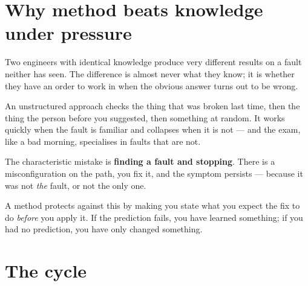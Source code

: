 \section{Why method beats knowledge under pressure}

Two engineers with identical knowledge produce very different results on a fault
neither has seen. The difference is almost never what they know; it is whether
they have an order to work in when the obvious answer turns out to be wrong.

An unstructured approach checks the thing that was broken last time, then the
thing the person before you suggested, then something at random. It works
quickly when the fault is familiar and collapses when it is not --- and the exam,
like a bad morning, specialises in faults that are not.

\begin{alertbox}
The characteristic mistake is \textbf{finding a fault and stopping}. There is a
misconfiguration on the path, you fix it, and the symptom persists --- because it
was not \emph{the} fault, or not the only one.

A method protects against this by making you state what you expect the fix to do
\emph{before} you apply it. If the prediction fails, you have learned something;
if you had no prediction, you have only changed something.
\end{alertbox}

\section{The cycle}

